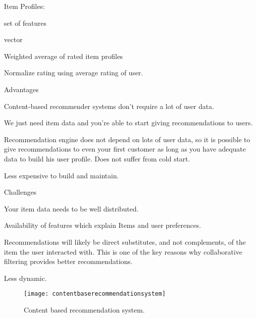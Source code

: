 	\begin{bulletedlist}
		\item Item Profiles:
		\begin{bulletedlist}
			\item set of features
			\item vector
		\end{bulletedlist}
		\begin{bulletedlist}
			\item Weighted average of rated item profiles
			\item Normalize rating using average rating of user.
		\end{bulletedlist}
		\item Advantages
		\begin{bulletedlist}
			\item Content-based recommender systems don't require a lot of user data.
			\item We just need item data and you're able to start giving recommendations to users.
			\item Recommendation engine does not depend on lots of user data, so it is possible to give recommendations to even your first customer as long as you have adequate data to build his user profile. Does not suffer from cold start.
			\item Less expensive to build and maintain.
		\end{bulletedlist}
		\item Challenges
		\begin{bulletedlist}
			\item Your item data needs to be well distributed.
			\item Availability of features which explain Items and user preferences.
			\item Recommendations will likely be direct substitutes, and not complements, of the item the user interacted with.  This is one of the key reasons why collaborative filtering provides better recommendations.
			\item Less dynamic.
		\end{bulletedlist}
	\end{bulletedlist}

	\begin{figure}
		\centering
		\texttt{[image: contentbaserecommendationsystem]}
		\caption[Content based recommendation system]{Content based recommendation system.}
		\label{fig:contentbaserecommendationsystem}
	\end{figure}

